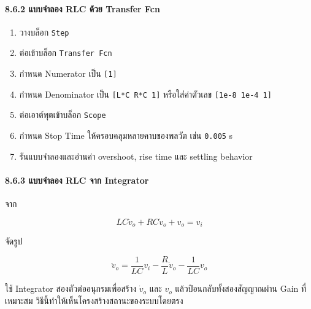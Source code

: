 \paragraph{8.6.2 แบบจำลอง RLC ด้วย Transfer Fcn}

\begin{enumerate}
    \item วางบล็อก \texttt{Step}
    \item ต่อเข้าบล็อก \texttt{Transfer Fcn}
    \item กำหนด Numerator เป็น \texttt{[1]}
    \item กำหนด Denominator เป็น \texttt{[L*C R*C 1]} หรือใส่ค่าตัวเลข \texttt{[1e-8 1e-4 1]}
    \item ต่อเอาต์พุตเข้าบล็อก \texttt{Scope}
    \item กำหนด Stop Time ให้ครอบคลุมหลายคาบของพลวัต เช่น \texttt{0.005} s
    \item รันแบบจำลองและอ่านค่า overshoot, rise time และ settling behavior
\end{enumerate}

\paragraph{8.6.3 แบบจำลอง RLC จาก Integrator}

จาก

\[
LC\ddot{v}_o+RC\dot{v}_o+v_o=v_i
\]

จัดรูป

\[
\ddot{v}_o
=
\frac{1}{LC}v_i
-\frac{R}{L}\dot{v}_o
-\frac{1}{LC}v_o
\]

ใช้ Integrator สองตัวต่ออนุกรมเพื่อสร้าง $\dot{v}_o$ และ $v_o$ แล้วป้อนกลับทั้งสองสัญญาณผ่าน Gain ที่เหมาะสม วิธีนี้ทำให้เห็นโครงสร้างสถานะของระบบโดยตรง


